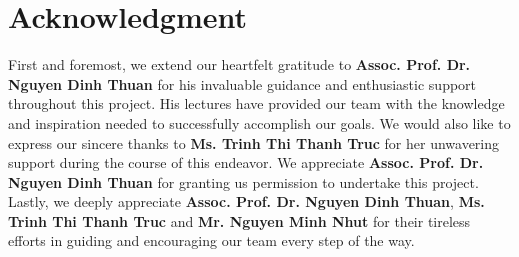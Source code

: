\documentclass{ieeeojies}
\begin{document}
\section*{Acknowledgment}
First and foremost, we extend our heartfelt gratitude to \textbf{Assoc. Prof. Dr. Nguyen Dinh Thuan} for his invaluable guidance and enthusiastic support throughout this project. His lectures have provided our team with the knowledge and inspiration needed to successfully accomplish our goals. We would also like to express our sincere thanks to \textbf{Ms. Trinh Thi Thanh Truc} for her unwavering support during the course of this endeavor. We appreciate \textbf{Assoc. Prof. Dr. Nguyen Dinh Thuan} for granting us permission to undertake this project. Lastly, we deeply appreciate \textbf{Assoc. Prof. Dr. Nguyen Dinh Thuan}, \textbf{Ms. Trinh Thi Thanh Truc} and \textbf{Mr. Nguyen Minh Nhut} for their tireless efforts in guiding and encouraging our team every step of the way.
\end{document}
